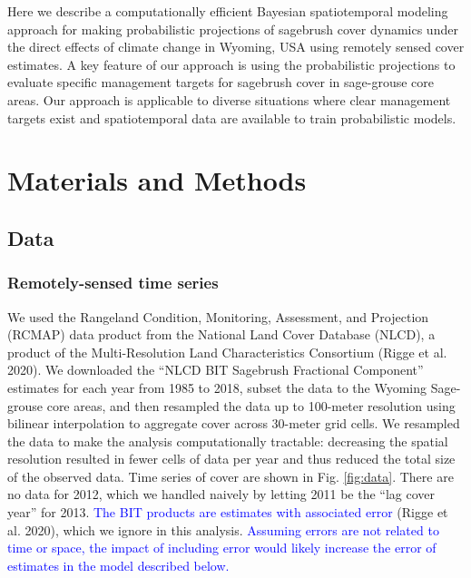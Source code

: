 \documentclass[
  12pt,
]{article}
\begin{document}
Here we describe a computationally efficient Bayesian spatiotemporal modeling approach for making probabilistic projections of sagebrush cover dynamics under the direct effects of climate change in Wyoming, USA using remotely sensed cover estimates.
A key feature of our approach is using the probabilistic projections to evaluate specific management targets for sagebrush cover in sage-grouse core areas.
Our approach is applicable to diverse situations where clear management targets exist and spatiotemporal data are available to train probabilistic models.

\hypertarget{materials-and-methods}{%
\section{Materials and Methods}\label{materials-and-methods}}

\hypertarget{data}{%
\subsection{Data}\label{data}}

\hypertarget{remotely-sensed-time-series}{%
\subsubsection{Remotely-sensed time series}\label{remotely-sensed-time-series}}

We used the Rangeland Condition, Monitoring, Assessment, and Projection (RCMAP) data product from the National Land Cover Database (NLCD), a product of the Multi-Resolution Land Characteristics Consortium (Rigge et al. 2020).
We downloaded the ``NLCD BIT Sagebrush Fractional Component'' estimates for each year from 1985 to 2018, subset the data to the Wyoming Sage-grouse core areas, and then resampled the data up to 100-meter resolution using bilinear interpolation to aggregate cover across 30-meter grid cells.
We resampled the data to make the analysis computationally tractable: decreasing the spatial resolution resulted in fewer cells of data per year and thus reduced the total size of the observed data.
Time series of cover are shown in Fig. \ref{fig:data}.
There are no data for 2012, which we handled naively by letting 2011 be the ``lag cover year'' for 2013.
\textcolor{blue}{The BIT products are estimates with associated error} (Rigge et al. 2020), which we ignore in this analysis.
\textcolor{blue}{Assuming errors are not related to time or space, the impact of including error would likely increase the error of estimates in the model described below.}
\end{document}
